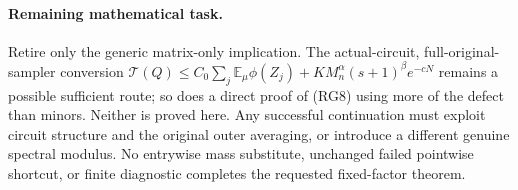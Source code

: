 \documentclass[11pt]{article}
\newcommand{\E}{\mathbb E}
\begin{document}
\paragraph{Remaining mathematical task.}
Retire only the generic matrix-only implication. The actual-circuit,
full-original-sampler conversion
$\mathcal T(Q)\le C_0\sum_j\E_\mu\phi(Z_j)
+K M_n^\alpha(s+1)^\beta e^{-cN}$ remains a possible sufficient route;
so does a direct proof of (RG8) using more of the defect than minors.
Neither is proved here. Any successful continuation must exploit
circuit structure and the original outer averaging, or introduce a
different genuine spectral modulus. No entrywise mass substitute,
unchanged failed pointwise shortcut, or finite diagnostic completes
the requested fixed-factor theorem.
\end{document}
